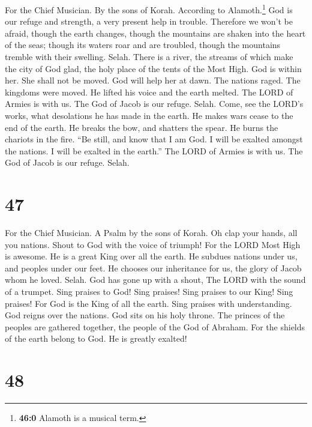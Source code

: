 For the Chief Musician. By the sons of Korah. According to
Alamoth.\footnote{\textbf{46:0} Alamoth is a musical term.}
 God is our refuge and strength, a very present help in
trouble.  Therefore we won't be afraid, though the earth
changes, though the mountains are shaken into the heart of the seas;
 though its waters roar and are troubled, though the
mountains tremble with their swelling. Selah.  There is a
river, the streams of which make the city of God glad, the holy place of
the tents of the Most High.  God is within her. She shall
not be moved. God will help her at dawn.  The nations
raged. The kingdoms were moved. He lifted his voice and the earth
melted.  The LORD of Armies is with us. The God of Jacob
is our refuge. Selah.  Come, see the LORD's works, what
desolations he has made in the earth.  He makes wars cease
to the end of the earth. He breaks the bow, and shatters the spear. He
burns the chariots in the fire.  ``Be still, and know
that I am God. I will be exalted amongst the nations. I will be exalted
in the earth.''  The LORD of Armies is with us. The God
of Jacob is our refuge. Selah.

\hypertarget{section-46}{%
\section{47}\label{section-46}}

For the Chief Musician. A Psalm by the sons of Korah.  Oh
clap your hands, all you nations. Shout to God with the voice of
triumph!  For the LORD Most High is awesome. He is a great
King over all the earth.  He subdues nations under us, and
peoples under our feet.  He chooses our inheritance for
us, the glory of Jacob whom he loved. Selah.  God has gone
up with a shout, The LORD with the sound of a trumpet. 
Sing praises to God! Sing praises! Sing praises to our King! Sing
praises!  For God is the King of all the earth. Sing
praises with understanding.  God reigns over the nations.
God sits on his holy throne.  The princes of the peoples
are gathered together, the people of the God of Abraham. For the shields
of the earth belong to God. He is greatly exalted!

\hypertarget{section-47}{%
\section{48}\label{section-47}}

